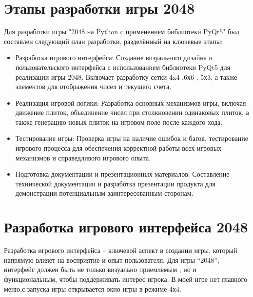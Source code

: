 \section{\label{subsec:ch01/sec01/sub01}Этапы разработки игры 2048}
Для разработки игры "2048 на Python с применением библиотеки PyQt5" был составлен следующий план разработки, разделённый на ключевые этапы:
\begin{itemize}
\item  Разработка игрового интерфейса: Создание визуального дизайна и пользовательского интерфейса с использованием библиотеки PyQt5 для реализации игры 2048. Включает разработку сетки 4x4 ,6х6 , 5х3, а также элементов для отображения чисел и текущего счета.

\item  Реализация игровой логики: Разработка основных механизмов игры, включая движение плиток, объединение чисел при столкновении одинаковых плиток, а также генерацию новых плиток на игровом поле после каждого хода.
\item  Тестирование игры: Проверка игры на наличие ошибок и багов, тестирование игрового процесса для обеспечения корректной работы всех игровых механизмов и справедливого игрового опыта.
\item Подготовка документации и презентационных материалов: Составление технической документации и разработка презентации продукта для демонстрации потенциальным заинтересованным сторонам.
\end{itemize}
\section{\label{subsec:ch01/sec01/sub01}Разработка игрового интерфейса 2048}
Разработка игрового интерфейса – ключевой аспект в создании игры, который напрямую влияет на восприятие и опыт пользователя. Для игры “2048”, интерфейс должен быть не только визуально приемлемым , но и функциональным, чтобы поддерживать интерес игрока.
В моей игре нет главного меню,с запуска игры открывается окно игры в режиме 4х4.


